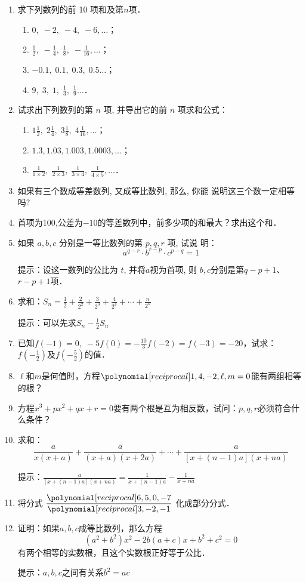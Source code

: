 \begin{enumerate}
    \item 求下列数列的前 10 项和及第$n$项．
\begin{enumerate}
    \item $0,\;-2,\;-4,\;-6, \ldots$；
    \item $\frac{1}{2},\;-\frac{1}{4},\; \frac{1}{8},\;-\frac{1}{16}, \ldots$；
    \item $-0.1,\;0.1,\;0.3,\;0.5 \ldots$；
    \item $9,\;3,\;1,\; \frac{1}{3},\; \frac{1}{9} \ldots$．
\end{enumerate}

\item 试求出下列数列的第 $n$ 项, 并导出它的前 $n$ 项求和公式：
\begin{enumerate}
    \item $1 \frac{1}{2},\; 2 \frac{1}{4}, \;3 \frac{1}{8} ,\; 4 \frac{1}{16}, \ldots$；
    \item $ 1.3,1.03,1.003,1.0003, \ldots$；
    \item $\frac{1}{1 \times 2},\; \frac{1}{2 \times 3},\; \frac{1}{3 \times 4},\; \frac{1}{4 \times 5},\ldots$．
\end{enumerate}

\item 如果有三个数成等差数列, 又成等比数列, 那么, 你能
    说明这三个数一定相等吗?
    \item 首项为100,公差为$-10$的等差数列中，前多少项的和最大？求出这个和．
\item  如果 $a, b, c$ 分别是一等比数列的第 $p, q, r$ 项, 试说
    明：
    $$a^{q-r} \cdot b^{r-p} \cdot c^{p-q}=1$$
    
    提示：设这一数列的公比为 $t$, 并将$a$视为首项, 则 $b, c$分别是第$q-p+1$、$r-p+1$项．

\item 求和：$S_n=\frac{1}{2}+\frac{2}{2^2}+\frac{3}{2^3}+\frac{4}{2^4}+\cdots+\frac{n}{2^n}$

提示：可以先求$S_n-\frac{1}{2}S_n$


\item 已知$f(-1)=0,\; -5f(0)=-\frac{10}{3}f(-2)=f(-3)=-20$，试求：$f\left(-\frac{1}{2}\right)$及$f\left(-\frac{5}{2}\right)$的值．

\item $\ell$和$m$是何值时，方程$\poly{1,4,-2,\ell ,m}=0$能有两组相等的根？
\item 方程$x^3+px^2+qx+r=0$要有两个根是互为相反数，试问：$p,q,r$必须符合什么条件？

\item 求和：
\[\frac{a}{x(x+a)}+\frac{a}{(x+a)(x+2a)}+\cdots +\frac{a}{[x+(n-1)a](x+na)}\]

提示：$\frac{a}{[x+(n-1)a](x+na)}=\frac{1}{x+(n-1)a}-\frac{1}{x+na}$

\item 将分式 $\frac{\poly{6,5,0,-7}}{\poly{3,-2,-1}}$ 化成部分分式．

\item 证明：如果$a,b,c$成等比数列，那么方程
\[(a^2+b^2)x^2-2b(a+c)x+b^2+c^2=0\]
有两个相等的实数根，且这个实数根正好等于公比．

提示：$a,b,c$之间有关系$b^2=ac$

\end{enumerate}